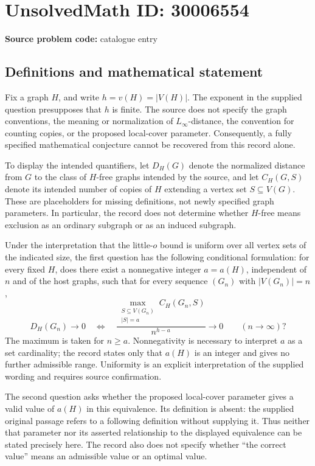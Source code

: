 \documentclass[11pt]{article}
\begin{document}
\section*{UnsolvedMath ID: 30006554}
\textbf{Source problem code:} catalogue entry
\subsection{Definitions and mathematical statement}
Fix a graph \(H\), and write \(h=v(H)=|V(H)|\). The exponent in the supplied question presupposes that \(h\) is finite. The source does not specify the graph conventions, the meaning or normalization of \(L_\infty\)-distance, the convention for counting copies, or the proposed local-cover parameter. Consequently, a fully specified mathematical conjecture cannot be recovered from this record alone.

To display the intended quantifiers, let \(D_H(G)\) denote the normalized distance from \(G\) to the class of \(H\)-free graphs intended by the source, and let \(C_H(G,S)\) denote its intended number of copies of \(H\) extending a vertex set \(S\subseteq V(G)\). These are placeholders for missing definitions, not newly specified graph parameters. In particular, the record does not determine whether \(H\)-free means exclusion as an ordinary subgraph or as an induced subgraph.

Under the interpretation that the little-\(o\) bound is uniform over all vertex sets of the indicated size, the first question has the following conditional formulation: for every fixed \(H\), does there exist a nonnegative integer \(a=a(H)\), independent of \(n\) and of the host graphs, such that for every sequence \((G_n)\) with \(|V(G_n)|=n\),
\[
D_H(G_n)\longrightarrow 0
\quad\Longleftrightarrow\quad
\frac{\displaystyle\max_{\substack{S\subseteq V(G_n)\\ |S|=a}} C_H(G_n,S)}{n^{h-a}}
\longrightarrow 0
\qquad(n\longrightarrow\infty)?
\]
The maximum is taken for \(n\geq a\). Nonnegativity is necessary to interpret \(a\) as a set cardinality; the record states only that \(a(H)\) is an integer and gives no further admissible range. Uniformity is an explicit interpretation of the supplied wording and requires source confirmation.

The second question asks whether the proposed local-cover parameter gives a valid value of \(a(H)\) in this equivalence. Its definition is absent: the supplied original passage refers to a following definition without supplying it. Thus neither that parameter nor its asserted relationship to the displayed equivalence can be stated precisely here. The record also does not specify whether ``the correct value'' means an admissible value or an optimal value.
\end{document}
